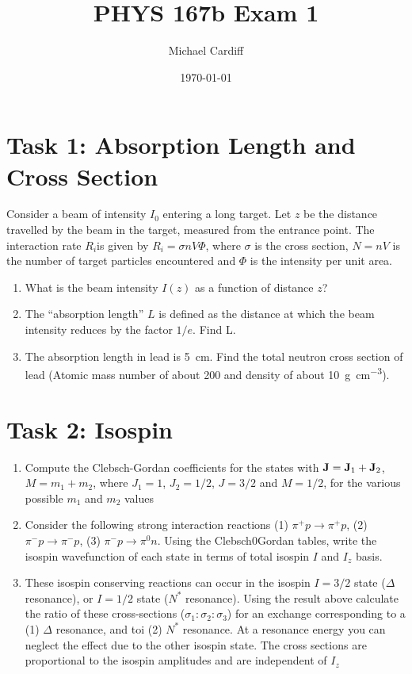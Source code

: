 \documentclass[12pt]{article}
\title{\vspace{-3em}PHYS 167b Exam 1}
\author{Michael Cardiff}
\date{\today}
\begin{document}
\maketitle
\section*{Task 1: Absorption Length and Cross Section}
\begin{problem}
  Consider a beam of intensity $I_0$ entering a long target. Let $z$ be the distance travelled by the beam in the target, measured from the entrance point. The interaction rate $R_i$is given by $R_i=\sigma nV\Phi$, where $\sigma$ is the cross section, $N=nV$ is the number of target particles encountered and $\Phi$ is the intensity per unit area.
  \begin{enumerate}
  \item What is the beam intensity $I(z)$ as a function of distance $z$?
  \item The ``absorption length'' $L$ is defined as the distance at which the beam intensity reduces by the factor $1/e$. Find L.
  \item The absorption length in lead is \SI{5}{cm}. Find the total neutron cross section of lead (Atomic mass number of about 200 and density of about \SI{10}{g.cm^{-3}}).
  \end{enumerate}
\end{problem}

\newpage
\section*{Task 2: Isospin}
\begin{problem}
  \begin{enumerate}
  \item Compute the Clebsch-Gordan coefficients for the states with $\vb{J}=\vb{J}_1+\vb{J}_2$, $M=m_1+m_2$, where $J_1=1$, $J_2=1/2$, $J=3/2$ and $M=1/2$, for the various possible $m_1$ and $m_2$ values
  \item Consider the following strong interaction reactions (1) $\pi^+p\to\pi^+p$, (2) $\pi^-p\to\pi^-p$, (3) $\pi^-p\to\pi^0n$. Using the Clebsch0Gordan tables, write the isospin wavefunction of each state in terms of total isospin $I$ and $I_z$ basis.
  \item These isospin conserving reactions can occur in the isospin $I=3/2$ state ($\Delta$ resonance), or $I=1/2$ state ($N^*$ resonance). Using the result above calculate the ratio of these cross-sections ($\sigma_1:\sigma_2:\sigma_3$) for an exchange corresponding to a (1) $\Delta$ resonance, and toi (2) $N^*$ resonance. At a resonance energy you can neglect the effect due to the other isospin state. The cross sections are proportional to the isospin amplitudes and are independent of $I_z$
  \end{enumerate}
\end{problem}
\end{document}
